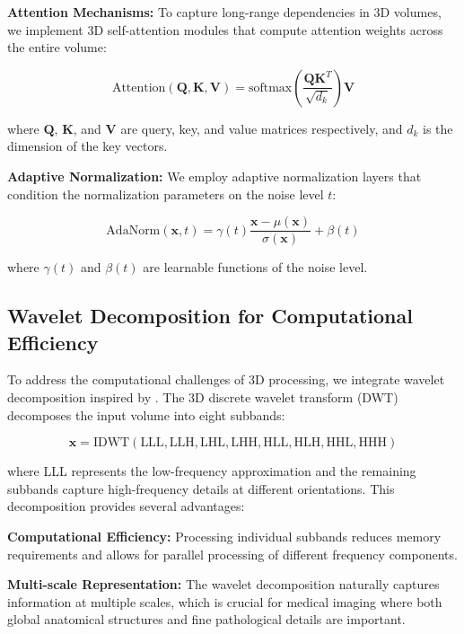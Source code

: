 \documentclass{midl} %
\begin{document}
\textbf{Attention Mechanisms:} To capture long-range dependencies in 3D volumes, we implement 3D self-attention modules that compute attention weights across the entire volume:

\begin{equation}
\text{Attention}(\mathbf{Q}, \mathbf{K}, \mathbf{V}) = \text{softmax}\left(\frac{\mathbf{Q}\mathbf{K}^T}{\sqrt{d_k}}\right)\mathbf{V}
\end{equation}

where $\mathbf{Q}$, $\mathbf{K}$, and $\mathbf{V}$ are query, key, and value matrices respectively, and $d_k$ is the dimension of the key vectors.

\textbf{Adaptive Normalization:} We employ adaptive normalization layers that condition the normalization parameters on the noise level $t$:

\begin{equation}
\text{AdaNorm}(\mathbf{x}, t) = \gamma(t) \frac{\mathbf{x} - \mu(\mathbf{x})}{\sigma(\mathbf{x})} + \beta(t)
\end{equation}

where $\gamma(t)$ and $\beta(t)$ are learnable functions of the noise level.

\subsection{Wavelet Decomposition for Computational Efficiency}

To address the computational challenges of 3D processing, we integrate wavelet decomposition inspired by \citet{friedrich2024wdm}. The 3D discrete wavelet transform (DWT) decomposes the input volume into eight subbands:

\begin{equation}
\mathbf{x} = \text{IDWT}(\text{LLL}, \text{LLH}, \text{LHL}, \text{LHH}, \text{HLL}, \text{HLH}, \text{HHL}, \text{HHH})
\end{equation}

where LLL represents the low-frequency approximation and the remaining subbands capture high-frequency details at different orientations. This decomposition provides several advantages:

\textbf{Computational Efficiency:} Processing individual subbands reduces memory requirements and allows for parallel processing of different frequency components.

\textbf{Multi-scale Representation:} The wavelet decomposition naturally captures information at multiple scales, which is crucial for medical imaging where both global anatomical structures and fine pathological details are important.
\end{document}
